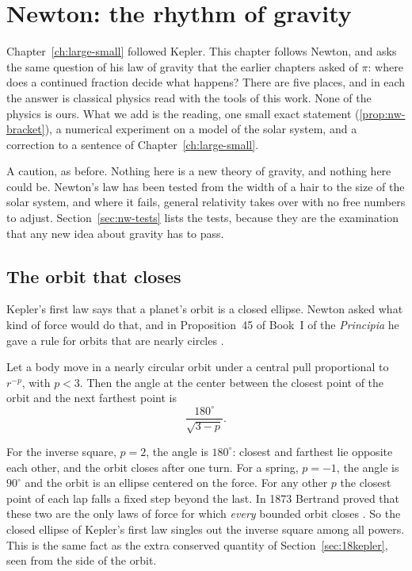 \chapter{Newton: the rhythm of gravity}\label{ch:newton}
\addednote{\revF}

Chapter~\ref{ch:large-small} followed Kepler. This chapter follows Newton, and asks the same question of his law of gravity that the earlier chapters asked of $\pi$: where does a continued fraction decide what happens? There are five places, and in each the answer is classical physics read with the tools of this work. None of the physics is ours. What we add is the reading, one small exact statement (\cref{prop:nw-bracket}), a numerical experiment on a model of the solar system, and a correction to a sentence of Chapter~\ref{ch:large-small}.

A caution, as before. Nothing here is a new theory of gravity, and nothing here could be. Newton's law has been tested from the width of a hair to the size of the solar system, and where it fails, general relativity takes over with no free numbers to adjust. Section~\ref{sec:nw-tests} lists the tests, because they are the examination that any new idea about gravity has to pass.

\section{The orbit that closes}\label{sec:nw-close}

Kepler's first law says that a planet's orbit is a closed ellipse. Newton asked what kind of force would do that, and in Proposition~45 of Book~I of the \emph{Principia} he gave a rule for orbits that are nearly circles \citep{Newton1687,Chandrasekhar1995}.

\begin{proposition}\label{prop:nw-45}
Let a body move in a nearly circular orbit under a central pull proportional to $r^{-p}$, with $p < 3$. Then the angle at the center between the closest point of the orbit and the next farthest point is
\[
\frac{180^\circ}{\sqrt{3 - p}} .
\]
\end{proposition}

For the inverse square, $p = 2$, the angle is $180^\circ$: closest and farthest lie opposite each other, and the orbit closes after one turn. For a spring, $p = -1$, the angle is $90^\circ$ and the orbit is an ellipse centered on the force. For any other $p$ the closest point of each lap falls a fixed step beyond the last. In 1873 Bertrand proved that these two are the only laws of force for which \emph{every} bounded orbit closes \citep{Bertrand1873}. So the closed ellipse of Kepler's first law singles out the inverse square among all powers. This is the same fact as the extra conserved quantity of Section~\ref{sec:18kepler}, seen from the side of the orbit.

